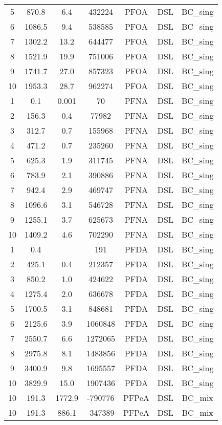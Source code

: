 \begin{longtable}[c]{ccccccc}
5 & 870.8 & 6.4 & 432224 & PFOA & DSL & BC\_sing \\
6 & 1086.5 & 9.4 & 538585 & PFOA & DSL & BC\_sing \\
7 & 1302.2 & 13.2 & 644477 & PFOA & DSL & BC\_sing \\
8 & 1521.9 & 19.9 & 751006 & PFOA & DSL & BC\_sing \\
9 & 1741.7 & 27.0 & 857323 & PFOA & DSL & BC\_sing \\
10 & 1953.3 & 28.7 & 962274 & PFOA & DSL & BC\_sing \\
1 & 0.1 & 0.001 & 70 & PFNA & DSL & BC\_sing \\
2 & 156.3 & 0.4 & 77982 & PFNA & DSL & BC\_sing \\
3 & 312.7 & 0.7 & 155968 & PFNA & DSL & BC\_sing \\
4 & 471.2 & 0.7 & 235260 & PFNA & DSL & BC\_sing \\
5 & 625.3 & 1.9 & 311745 & PFNA & DSL & BC\_sing \\
6 & 783.9 & 2.1 & 390886 & PFNA & DSL & BC\_sing \\
7 & 942.4 & 2.9 & 469747 & PFNA & DSL & BC\_sing \\
8 & 1096.6 & 3.1 & 546728 & PFNA & DSL & BC\_sing \\
9 & 1255.1 & 3.7 & 625673 & PFNA & DSL & BC\_sing \\
10 & 1409.2 & 4.6 & 702290 & PFNA & DSL & BC\_sing \\
1 & 0.4 &  & 191 & PFDA & DSL & BC\_sing \\
2 & 425.1 & 0.4 & 212357 & PFDA & DSL & BC\_sing \\
3 & 850.2 & 1.0 & 424622 & PFDA & DSL & BC\_sing \\
4 & 1275.4 & 2.0 & 636678 & PFDA & DSL & BC\_sing \\
5 & 1700.5 & 3.1 & 848681 & PFDA & DSL & BC\_sing \\
6 & 2125.6 & 3.9 & 1060848 & PFDA & DSL & BC\_sing \\
7 & 2550.7 & 6.6 & 1272065 & PFDA & DSL & BC\_sing \\
8 & 2975.8 & 8.1 & 1483856 & PFDA & DSL & BC\_sing \\
9 & 3400.9 & 9.8 & 1695557 & PFDA & DSL & BC\_sing \\
10 & 3829.9 & 15.0 & 1907436 & PFDA & DSL & BC\_sing \\
10 & 191.3 & 1772.9 & -790776 & PFPeA & DSL & BC\_mix \\
10 & 191.3 & 886.1 & -347389 & PFPeA & DSL & BC\_mix \\

\end{longtable}
